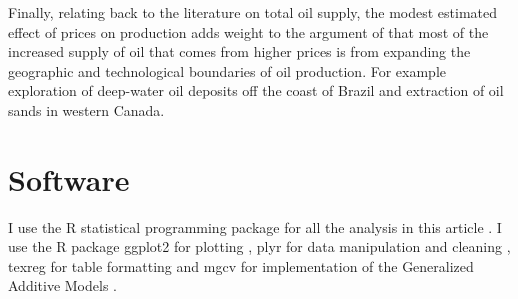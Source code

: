 \documentclass[11pt]{article}
\begin{document}
Finally, relating back to the literature on total oil supply, the modest estimated effect of prices on production adds weight to the argument of \citet{hamilton_oil_2012} that most of the increased supply of oil that comes from higher prices is from expanding the geographic and technological boundaries of oil production.  For example exploration of deep-water oil deposits off the coast of Brazil and extraction of oil sands in western Canada.

\FloatBarrier
\section{Software}
I use the R statistical programming package for all the analysis in this article \citep{r_core_team_r:_2013}.  I use the R package ggplot2 for plotting \citep{wickham_ggplot2:_2009}, plyr for data manipulation and cleaning \citep{wickham_split-apply-combine_2011}, texreg for table formatting \citep{leifeld_texreg:_2013} and mgcv for implementation of the Generalized Additive Models \citep{wood_fast_2011}.



\end{document}
